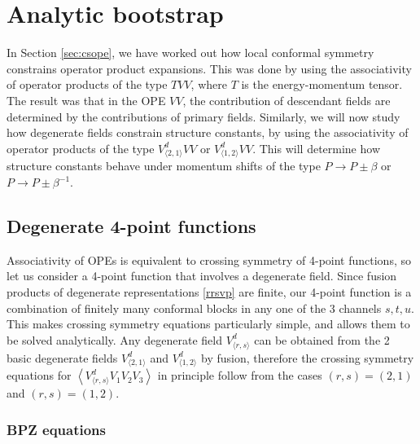 \documentclass[12pt, a4paper]{article}
\theoremstyle{break}
\begin{document}
\section{Analytic bootstrap}\label{sec:ab}

In Section \ref{sec:csope}, we have worked out how local conformal symmetry constrains operator product expansions. This was done by using the associativity of operator products of the type $TVV$, where $T$ is the energy-momentum tensor. The result was that in the OPE $VV$, the contribution of descendant fields are determined by the contributions of primary fields. Similarly, we will now study how degenerate fields constrain structure constants, by using the associativity of 
operator products of the type $V^d_{\langle 2,1\rangle}VV$ or $V^d_{\langle 1,2\rangle}VV$.  
This will determine how structure constants behave under momentum shifts of the type $P\to P\pm \beta$ or $P\to P\pm \beta^{-1}$. 

\subsection{Degenerate 4-point functions}

Associativity of OPEs is equivalent to crossing symmetry of 4-point functions, so let us consider a 4-point function that involves a degenerate field. Since fusion products of degenerate representations \eqref{rrsvp} are finite, our 4-point function is a combination of finitely many conformal blocks in any one of the 3 channels $s,t,u$. This makes crossing symmetry equations particularly simple, and allows them to be solved analytically. 
Any degenerate field $V^d_{\langle r,s\rangle}$ can be obtained from the 2 basic degenerate fields $V^d_{\langle 2,1\rangle}$ and $V^d_{\langle 1,2\rangle}$ by fusion, therefore the crossing symmetry equations for $\left<V^d_{\langle r,s\rangle}V_1V_2V_3\right>$ in principle follow from the cases $(r,s)=(2,1)$ and $(r,s)=(1,2)$. 

\subsubsection{BPZ equations}
\end{document}
